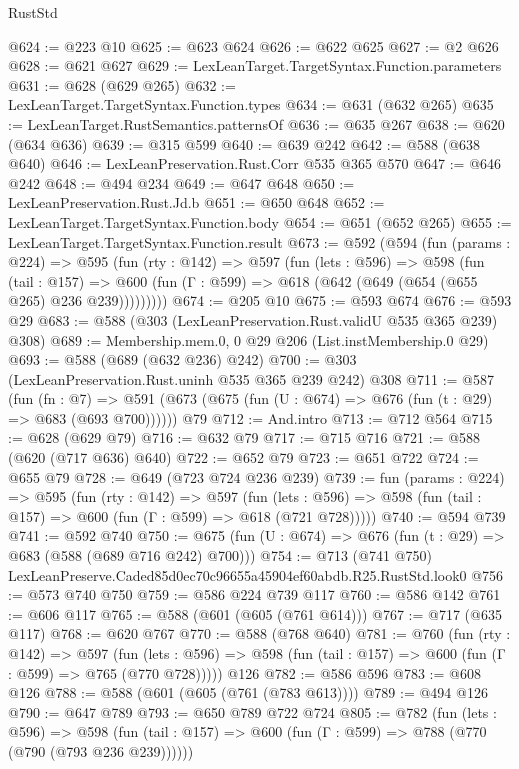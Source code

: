 \begin{lexlean}{RustStd}
\begin{coremodule}
@624 := @223 @10
@625 := @623 @624
@626 := @622 @625
@627 := @2 @626
@628 := @621 @627
@629 := LexLeanTarget.TargetSyntax.Function.parameters
@631 := @628 (@629 @265)
@632 := LexLeanTarget.TargetSyntax.Function.types
@634 := @631 (@632 @265)
@635 := LexLeanTarget.RustSemantics.patternsOf
@636 := @635 @267
@638 := @620 (@634 @636)
@639 := @315 @599
@640 := @639 @242
@642 := @588 (@638 @640)
@646 := LexLeanPreservation.Rust.Corr @535 @365 @570
@647 := @646 @242
@648 := @494 @234
@649 := @647 @648
@650 := LexLeanPreservation.Rust.Jd.b
@651 := @650 @648
@652 := LexLeanTarget.TargetSyntax.Function.body
@654 := @651 (@652 @265)
@655 := LexLeanTarget.TargetSyntax.Function.result
@673 := @592
    (@594
      (fun (params : @224) =>
      @595
        (fun (rty : @142) =>
        @597
          (fun (lets : @596) =>
          @598
            (fun (tail : @157) =>
            @600 (fun (Γ : @599) => @618 (@642 (@649 (@654 (@655 @265) @236 @239)))))))))
@674 := @205 @10
@675 := @593 @674
@676 := @593 @29
@683 := @588 (@303 (LexLeanPreservation.Rust.validU @535 @365 @239) @308)
@689 := Membership.mem.{0, 0} @29 @206 (List.instMembership.{0} @29)
@693 := @588 (@689 (@632 @236) @242)
@700 := @303 (LexLeanPreservation.Rust.uninh @535 @365 @239 @242) @308
@711 := @587
    (fun (fn : @7) =>
    @591 (@673 (@675 (fun (U : @674) => @676 (fun (t : @29) => @683 (@693 @700))))))
    @79
@712 := And.intro
@713 := @712 @564
@715 := @628 (@629 @79)
@716 := @632 @79
@717 := @715 @716
@721 := @588 (@620 (@717 @636) @640)
@722 := @652 @79
@723 := @651 @722
@724 := @655 @79
@728 := @649 (@723 @724 @236 @239)
@739 := fun (params : @224) =>
  @595
    (fun (rty : @142) =>
    @597
      (fun (lets : @596) => @598 (fun (tail : @157) => @600 (fun (Γ : @599) => @618 (@721 @728)))))
@740 := @594 @739
@741 := @592 @740
@750 := @675 (fun (U : @674) => @676 (fun (t : @29) => @683 (@588 (@689 @716 @242) @700)))
@754 := @713 (@741 @750) LexLeanPreserve.Caded85d0ec70c96655a45904ef60abdb.R25.RustStd.look0
@756 := @573 @740 @750
@759 := @586 @224 @739 @117
@760 := @586 @142
@761 := @606 @117
@765 := @588 (@601 (@605 (@761 @614)))
@767 := @717 (@635 @117)
@768 := @620 @767
@770 := @588 (@768 @640)
@781 := @760
    (fun (rty : @142) =>
    @597
      (fun (lets : @596) => @598 (fun (tail : @157) => @600 (fun (Γ : @599) => @765 (@770 @728)))))
    @126
@782 := @586 @596
@783 := @608 @126
@788 := @588 (@601 (@605 (@761 (@783 @613))))
@789 := @494 @126
@790 := @647 @789
@793 := @650 @789 @722 @724
@805 := @782
    (fun (lets : @596) =>
    @598 (fun (tail : @157) => @600 (fun (Γ : @599) => @788 (@770 (@790 (@793 @236 @239))))))

\end{coremodule}
\end{lexlean}
